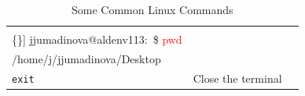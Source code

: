 \begin{table}[htbp]
\begin{tabular}{l|p{1.5in}|p{2.5in}}
\begin{minipage}{2.5in}
\begin{Verbatim}[commandchars=\\\{\}]
jjumadinova@aldenv113:~\$ \textcolor{red}{pwd} \\
/home/j/jjumadinova/Desktop
\end{Verbatim}
\end{minipage}\\
\hline
\rule{0em}{1.5em}\tt exit  & Close the terminal  &\\
\hline
\end{tabular}
\caption{Some Common Linux Commands}
\label{linux}
\end{table}


